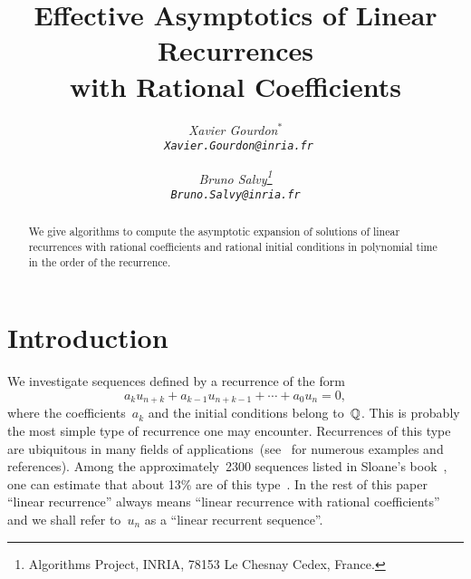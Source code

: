 

\def\Q{{\Bbb Q}}
\def\R{{\Bbb R}}
\def\C{{\Bbb C}}
\def\N{{\Bbb N}}
\def\Z{{\Bbb Z}}
\def\geq{\,{\Bbb\geqslant}\,}
\def\ge{\,{\Bbb\geqslant}\,}
\def\leq{\,{\Bbb\leqslant}\,}
\def\le{\,{\Bbb\leqslant}\,}
\newenvironment{proof}%
        {\par\noindent{\bf Proof.}}%
        {{\hfill{\Large$\Box$}}\smallskip}
\newtheorem{proposition}{Proposition}
\newtheorem{alg}{Algorithm}
\newtheorem{property}{Proposition}
\newtheorem{nota}{Notation}
\def\thenota{}
\newtheorem{task}{Task}
\newtheorem{th}{Theorem}

\title{\Large\bf Effective Asymptotics of Linear Recurrences\\ with
Rational Coefficients}
\author{\large\sl Xavier Gourdon$^{*}$\\{\normalshape\tt
Xavier.Gourdon@inria.fr}
\and\large\sl Bruno Salvy\thanks{Algorithms Project, INRIA, 78153 Le
Chesnay Cedex, France.}\\{\normalshape\tt Bruno.Salvy@inria.fr}}
\date{}


\maketitle
\begin{abstract}
We give algorithms to compute the asymptotic expansion of solutions
of linear recurrences with rational coefficients and rational initial
conditions in polynomial time in the order of the recurrence.
\end{abstract}

\section*{Introduction}
We investigate sequences defined by a recurrence of the form
\begin{equation}\label{recurrence}
  a_ku_{n+k}+a_{k-1}u_{n+k-1}+\cdots+a_0u_n=0,
\end{equation}
where the   coefficients~$a_k$  and the   initial    conditions belong
to~$\Q$. This is probably the most simple type  of recurrence  one may
encounter.  Recurrences of this type are ubiquitous  in many fields of
applications~(see~\cite{CeMiPi87}   for numerous examples   and
references).   Among    the  approximately~2300  sequences    listed
in Sloane's book~\cite{Sloane73}, one can estimate that  about 13\%
are of this 
type~\cite{Plouffe92}. In  the rest of   this paper ``linear
recurrence'' always  means 
``linear recurrence with rational   coefficients'' and we shall  refer
to~$u_n$ as a ``linear recurrent sequence''.

